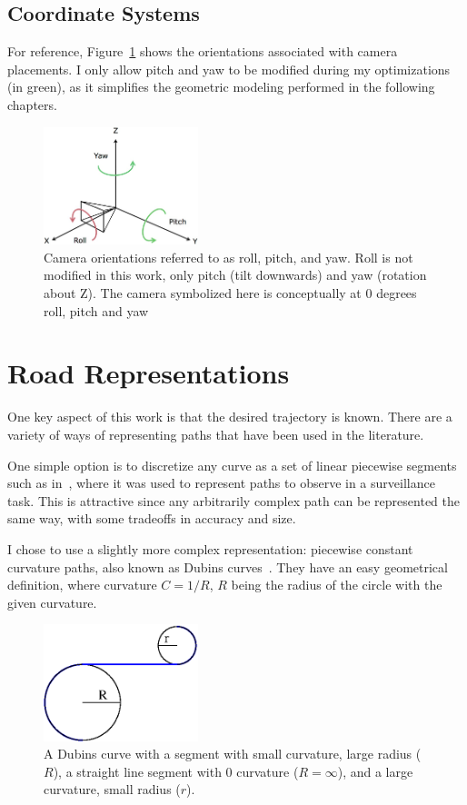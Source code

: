 \documentclass[a4paper,12pt,twoside,openright]{report}
\begin{document}
\subsection{Coordinate Systems}
For reference, Figure~\ref{fig:impl:rpy} shows the orientations
associated with camera placements. I only allow pitch and yaw
to be modified during my optimizations (in green), as it simplifies
the geometric modeling performed in the following chapters. 

\begin{figure}[htb]
    \centering
    \includegraphics[width=0.4\textwidth]{figures/rpy.png}
    \caption[Roll, Pitch and Yaw]{Camera orientations referred to as roll, pitch, and yaw. Roll is not modified 
        in this work, only pitch (tilt downwards) and yaw (rotation about Z). The camera symbolized here
    is conceptually at 0 degrees roll, pitch and yaw}
    \label{fig:impl:rpy}
\end{figure}

\section{Road Representations}

One key aspect of this work is that the desired trajectory is known.
There are a variety of ways of representing paths that have been
used in the literature.

One simple option is to discretize any curve as a set of linear
piecewise segments such as in~\cite{bodor2007optimal}, where it was used to 
represent paths to observe in a surveillance task. This is attractive
since any arbitrarily complex path can be represented the same way,
with some tradeoffs in accuracy and size. 

I chose to use a slightly more complex representation: piecewise
constant curvature paths, also known as Dubins curves~\cite{dubins1957curves}.
They have an easy geometrical definition, where curvature $C = 1/R$, $R$ 
being the radius of the circle with the given curvature.
\begin{figure}[htb]
    \centering
    \includegraphics[width=0.4\textwidth]{figures/dubins.eps}
    \caption[Dubins Curve]{A Dubins curve with a segment with small curvature, large radius ($R$), a straight line segment
    with 0 curvature ($R=\infty$), and a large curvature, small radius ($r$).}
    \label{fig:impl:dubins}
\end{figure}
\end{document}
